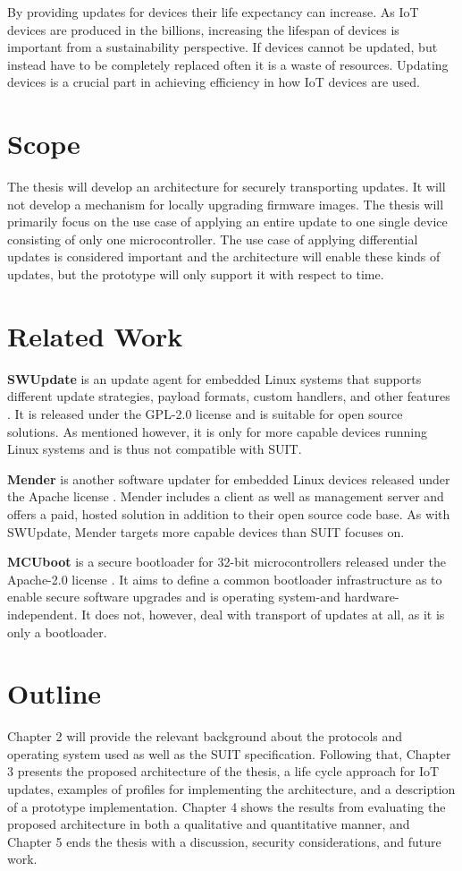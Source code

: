 \documentclass[0-thesis.tex]{subfiles}
\begin{document}
By providing updates for devices their life expectancy can increase. As IoT devices are
produced in the billions, increasing the lifespan of devices is important from a
sustainability perspective. If devices cannot be updated, but instead have to be completely
replaced often it is a waste of resources. Updating devices is a crucial part in achieving
efficiency in how IoT devices are used.

\section{Scope}
\label{sec:scope}
The thesis will develop an architecture for securely transporting updates. It will not
develop a mechanism for locally upgrading firmware images. The thesis will primarily focus
on the use case of applying an entire update to one single device consisting of only one
microcontroller. The use case of applying differential updates is considered important and
the architecture will enable these kinds of updates, but the prototype will only support
it with respect to time.

\section{Related Work}
\label{sec:related-work}
\textbf{SWUpdate} is an update agent for embedded Linux systems that supports different
update strategies, payload formats, custom handlers, and other features
\parencite{swupdate}. It is released under the GPL-2.0 license and is suitable for open
source solutions. As mentioned however, it is only for more capable devices running Linux
systems and is thus not compatible with SUIT.

\textbf{Mender} is another software updater for embedded Linux devices released under the
Apache license \parencite{mender}. Mender includes a client as well as management server
and offers a paid, hosted solution in addition to their open source code base. As with
SWUpdate, Mender targets more capable devices than SUIT focuses on.

\textbf{MCUboot} is a secure bootloader for 32-bit microcontrollers released under the
Apache-2.0 license \parencite{MCUboot}. It aims to define a common bootloader
infrastructure as to enable secure software upgrades and is operating system-and
hardware-independent. It does not, however, deal with transport of updates at all, as it
is only a bootloader.

\section{Outline}
\label{sec:outline}
Chapter 2 will provide the relevant background about the protocols and operating system
used as well as the SUIT specification. Following that, Chapter 3 presents the proposed
architecture of the thesis, a life cycle approach for IoT updates, examples of profiles
for implementing the architecture, and a description of a prototype implementation.
Chapter 4 shows the results from evaluating the proposed architecture in both a
qualitative and quantitative manner, and Chapter 5 ends the thesis with a discussion,
security considerations, and future work.
\end{document}
